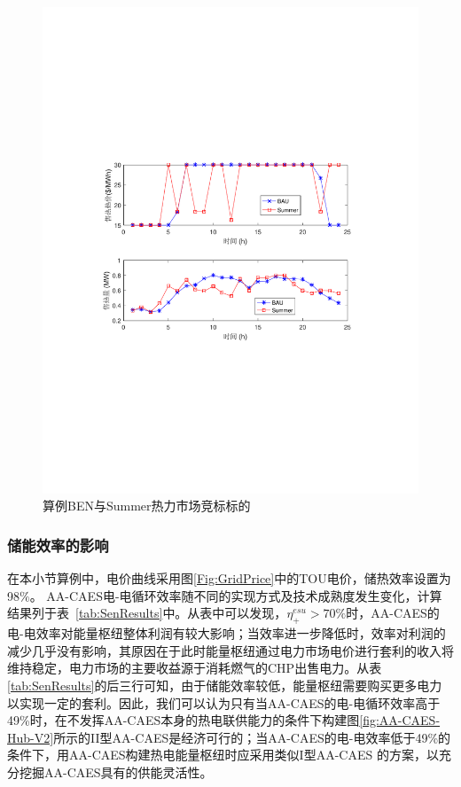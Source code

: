 \begin{figure}[!htp]
\centering
\includegraphics[scale=0.75]{figures/Chap4-13-HeatBidComp.pdf}
\caption{算例BEN与Summer热力市场竞标标的}
\label{Fig:HeatBidComp}
\end{figure}

\subsubsection{储能效率的影响}
在本小节算例中，电价曲线采用图\ref{Fig:GridPrice}中的TOU电价，储热效率设置为98$\%$。 AA-CAES电-电循环效率随不同的实现方式及技术成熟度发生变化，计算结果列于表~\ref{tab:SenResults}中。从表中可以发现，$\eta_{+}^{esu}>70\%$时，AA-CAES的电-电效率对能量枢纽整体利润有较大影响；当效率进一步降低时，效率对利润的减少几乎没有影响，其原因在于此时能量枢纽通过电力市场电价进行套利的收入将维持稳定，电力市场的主要收益源于消耗燃气的CHP出售电力。从表\ref{tab:SenResults}的后三行可知，由于储能效率较低，能量枢纽需要购买更多电力以实现一定的套利。因此，我们可以认为只有当AA-CAES的电-电循环效率高于49\%时，在不发挥AA-CAES本身的热电联供能力的条件下构建图\ref{fig:AA-CAES-Hub-V2}所示的II型AA-CAES是经济可行的；当AA-CAES的电-电效率低于49\%的条件下，用AA-CAES构建热电能量枢纽时应采用类似I型AA-CAES 的方案，以充分挖掘AA-CAES具有的供能灵活性。

